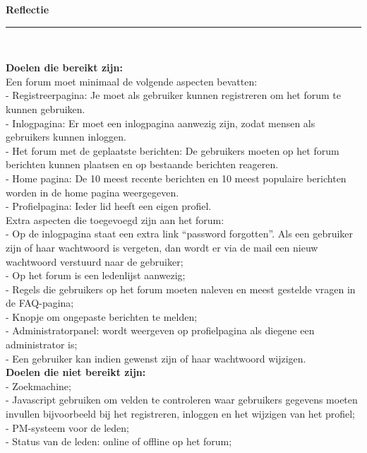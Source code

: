\documentclass[a4paper,12pt]{article}
\newcommand{\HRule}{\rule{\linewidth}{0.5mm}}
\begin{document}
\newpage
\begin{center}
{ \LARGE \bfseries Reflectie}\\[0.1cm]
\HRule \\[0.5cm]
\end{center}
{\bfseries Doelen die bereikt zijn:}\\
Een forum moet minimaal de volgende aspecten bevatten:\\
-	Registreerpagina: 
Je moet als gebruiker kunnen registreren om het forum \hspace{30 cm}te kunnen gebruiken.\\
-	Inlogpagina:
Er moet een inlogpagina aanwezig zijn, zodat mensen als gebruikers kunnen inloggen.\\
-	Het forum met de geplaatste berichten:
De gebruikers moeten op het forum berichten kunnen plaatsen en op bestaande berichten reageren.\\
-	Home pagina:
De 10 meest recente berichten en 10 meest populaire berichten worden in de home pagina weergegeven.\\
-	Profielpagina:
Ieder lid heeft een eigen profiel.\\

Extra aspecten die toegevoegd zijn aan het forum:\\
-	Op de inlogpagina staat een extra link “password forgotten”. Als een gebruiker zijn of haar wachtwoord is vergeten, dan wordt er via de mail een nieuw wachtwoord verstuurd naar de gebruiker;\\
-	Op het forum is een ledenlijst aanwezig;\\
-	Regels die gebruikers op het forum moeten naleven en meest gestelde vragen in de FAQ-pagina;\\
-	Knopje om ongepaste berichten te melden;\\
-	Administratorpanel: wordt weergeven op profielpagina als diegene een administrator is;\\
-	Een gebruiker kan indien gewenst zijn of haar wachtwoord wijzigen.\\

{\bfseries Doelen die niet bereikt zijn:}\\
-	Zoekmachine;\\
-	Javascript gebruiken om velden te controleren waar gebruikers gegevens moeten invullen bijvoorbeeld bij het registreren, inloggen en het wijzigen van het profiel;\\
-	PM-systeem voor de leden;\\
-	Status van de leden: online of offline op het forum;\\
\end{document}
